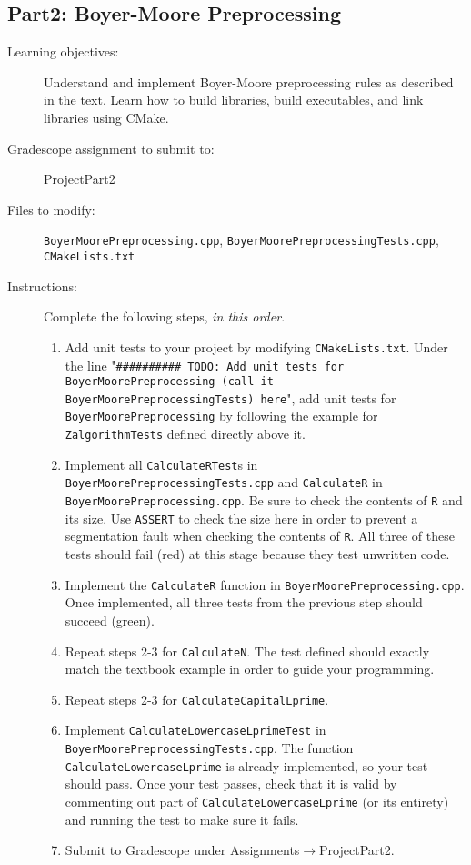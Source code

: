 \documentclass[paper=a4, fontsize=11pt]{scrartcl} %
\numberwithin{equation}{section} %
\numberwithin{figure}{section} %
\numberwithin{table}{section} %
\begin{document}
\subsection*{Part2: Boyer-Moore Preprocessing}
\begin{description}
	\item[Learning objectives:] Understand and implement Boyer-Moore preprocessing rules as described in the text. Learn how to build libraries, build executables, and link libraries using CMake.
	\item[Gradescope assignment to submit to:] ProjectPart2
	\item[Files to modify:] \texttt{BoyerMoorePreprocessing.cpp}, \texttt{BoyerMoorePreprocessingTests.cpp}, \texttt{CMakeLists.txt}
	\item[Instructions:] Complete the following steps, \textit{in this order}.
		\begin{enumerate}
			\item Add unit tests to your project by modifying \texttt{CMakeLists.txt}. Under the line "\texttt{\#\#\#\#\#\#\#\#\#\# TODO: Add unit tests for BoyerMoorePreprocessing (call it BoyerMoorePreprocessingTests) here}", add unit tests for \texttt{BoyerMoorePreprocessing} by following the example for \texttt{ZalgorithmTests} defined directly above it.
			\item Implement all \texttt{CalculateRTest}s in \texttt{BoyerMoorePreprocessingTests.cpp} and \texttt{CalculateR} in \texttt{BoyerMoorePreprocessing.cpp}. Be sure to check the contents of \texttt{R} and its size. Use \texttt{ASSERT} to check the size here in order to prevent a segmentation fault when checking the contents of \texttt{R}. All three of these tests should fail (red) at this stage because they test unwritten code.
			\item Implement the \texttt{CalculateR} function in \texttt{BoyerMoorePreprocessing.cpp}. Once implemented, all three tests from the previous step should succeed (green).
			\item Repeat steps 2-3 for \texttt{CalculateN}. The test defined should exactly match the textbook example in order to guide your programming.
			\item Repeat steps 2-3 for \texttt{CalculateCapitalLprime}.
			\item Implement \texttt{CalculateLowercaseLprimeTest} in \texttt{BoyerMoorePreprocessingTests.cpp}. The function \texttt{CalculateLowercaseLprime} is already implemented, so your test should pass. Once your test passes, check that it is valid by commenting out part of \texttt{CalculateLowercaseLprime} (or its entirety) and running the test to make sure it fails.
			\item Submit to Gradescope under Assignments$\to$ProjectPart2.
		\end{enumerate}
\end{description}
\end{document}
